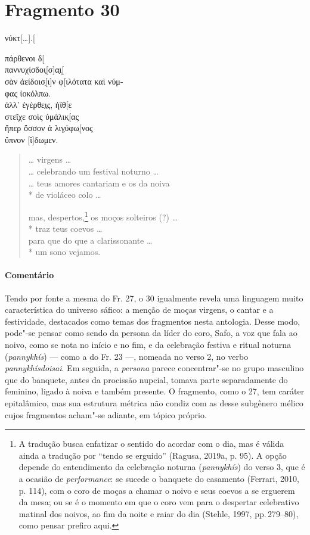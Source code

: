{\pagebreak
\section{Fragmento 30}

\begin{gkverse}
νύκτ[\ldots{}].[

πάρθενοι δ[\\
παννυχίσδοι̣[σ]α̣ι[̣\\
σὰν ἀείδοισ̣[ι]ν φ[ιλότατα καὶ νύμ-\\
φας ἰοκόλπω.\\
ἀλλ’ ἐγέρθε̣ι̣ς, ἠϊθ[ε\\
στεῖχε σοὶς ὐμάλικ̣[ας\\
ἤπερ ὄσσον ἀ λιγ̣ύφω̣[νος\\
ὔπνον [ἴ]δωμεν.
\end{gkverse}

\begin{verse}
\ldots{} virgens \ldots{}\\
\ldots{} celebrando um festival noturno \ldots{}\\
\ldots{} teus amores cantariam e os da noiva\\*
de violáceo colo \ldots{}

mas, despertos,\footnote{A tradução busca enfatizar o sentido do acordar com o dia, mas é válida ainda a tradução por ``tendo se erguido'' (Ragusa, 2019a, p. 95). A opção depende do entendimento da celebração noturna (\textit{pannykhís}) do verso 3, que é a ocasião de \textit{performance}:  se sucede o banquete do casamento (Ferrari, 2010, p. 114), com o coro de moças a chamar o noivo e seus coevos a se erguerem da mesa; ou se é o momento em que o coro vem para o despertar celebrativo matinal dos noivos, ao fim da noite e raiar do dia (Stehle, 1997, pp.\,279--80), como pensar prefiro aqui.} os moços solteiros (?) \ldots{}\\*
traz teus coevos  \ldots{}\\
para que do que a clarissonante \ldots{}\\*
um sono vejamos.
\end{verse}
\pagebreak
{\paragraph{Comentário} Tendo por fonte a mesma do Fr. 27, o 30 igualmente revela uma linguagem muito característica do universo sáfico: a menção de moças virgens, o cantar e a festividade, destacados como temas dos fragmentos nesta antologia. Desse modo, pode"-se pensar como sendo da persona da líder do coro, Safo, a
voz que fala ao noivo, como se nota no início e no fim, e da celebração
festiva e ritual noturna (\textit{pannykhís}) --- como a do Fr. 23 ---, nomeada no verso 2, no verbo \textit{pannykhísdoisai}. Em seguida, a \textit{persona} parece concentrar"-se no grupo masculino que do
banquete, antes da procissão nupcial, tomava parte separadamente do feminino,
ligado à noiva e também presente. O fragmento, como o 27, tem caráter
epitalâmico, mas sua estrutura métrica não condiz com as desse subgênero
mélico cujos fragmentos acham"-se adiante, em tópico próprio.}

}
